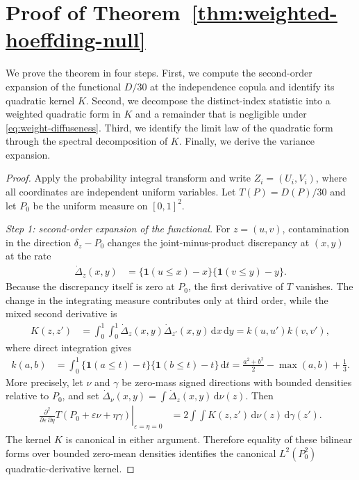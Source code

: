 \section{Proof of Theorem~\ref{thm:weighted-hoeffding-null}}
\label{app:hoeffding-null-proof}

We prove the theorem in four steps. First, we compute the second-order
expansion of the functional $D/30$ at the independence copula and identify
its quadratic kernel $K$. Second, we decompose the distinct-index statistic
into a weighted quadratic form in $K$ and a remainder that is negligible
under \eqref{eq:weight-diffuseness}. Third, we identify the limit law of the
quadratic form through the spectral decomposition of $K$. Finally, we derive
the variance expansion.

\begin{proof}
Apply the probability integral transform and write $Z_i=(U_i,V_i)$, where
all coordinates are independent uniform variables. Let $T(P)=D(P)/30$ and
let $P_0$ be the uniform measure on $[0,1]^2$.

\medskip\noindent
\emph{Step 1: second-order expansion of the functional.}
For $z=(u,v)$, contamination in the direction $\delta_z-P_0$ changes the
joint-minus-product discrepancy at $(x,y)$ at the rate
\begin{align*}
  \dot\Delta_z(x,y)
  &= \{\mathbf{1}(u\leq x)-x\}
     \{\mathbf{1}(v\leq y)-y\}.
\end{align*}
Because the discrepancy itself is zero at $P_0$, the first derivative of $T$
vanishes. The change in the integrating measure contributes only at third
order, while the mixed second derivative is
\begin{align*}
  K(z,z')
  &= \int_0^1\int_0^1
     \dot\Delta_z(x,y)\dot\Delta_{z'}(x,y)
     \,\mathrm{d}x\,\mathrm{d}y
   = k(u,u')k(v,v'),
\end{align*}
where direct integration gives
\begin{align*}
  k(a,b)
  &= \int_0^1
     \{\mathbf{1}(a\leq t)-t\}
     \{\mathbf{1}(b\leq t)-t\}\,\mathrm{d}t
   = \frac{a^2+b^2}{2}-\max(a,b)+\frac13.
\end{align*}
More precisely, let $\nu$ and $\gamma$ be zero-mass signed directions with
bounded densities relative to $P_0$, and set
$\dot\Delta_\nu(x,y)=\int \dot\Delta_z(x,y)\,\mathrm{d}\nu(z)$. Then
\begin{align*}
  \left.
  \frac{\partial^2}{\partial\varepsilon\,\partial\eta}
  T(P_0+\varepsilon\nu+\eta\gamma)
  \right|_{\varepsilon=\eta=0}
  &=2\int\!\!\int K(z,z')\,\mathrm{d}\nu(z)\,\mathrm{d}\gamma(z').
\end{align*}
The kernel $K$ is canonical in either argument. Therefore equality of these
bilinear forms over bounded zero-mean densities identifies the canonical
$L^2(P_0^2)$ quadratic-derivative kernel.


\end{proof}
